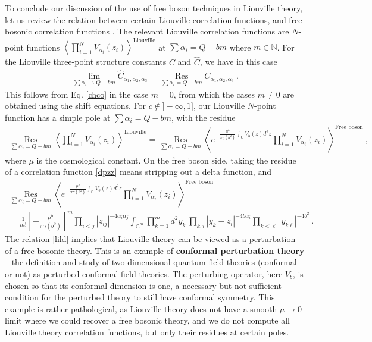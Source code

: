 \documentclass[12pt, a4paper, notitlepage, twoside]{report}
\numberwithin{equation}{section}
\theoremstyle{break}
\begin{document}
To conclude our discussion of the use of free boson techniques in Liouville theory, let us review
the relation between certain Liouville correlation functions, and free bosonic correlation functions \cite{zz95}.
The relevant Liouville correlation functions are $N$-point functions $\left\langle \prod_{i=1}^N V_{\alpha_i}(z_i)\right\rangle^{\text{Liouville}}$ at $\sum\alpha_i = Q-bm$ where $m\in \mathbb{N}$.  
For the Liouville three-point structure constants $C$ and $\hat C$, we have in this case
\begin{align}
 \lim_{\sum\alpha_i \to Q-bm} \hat C_{\alpha_1,\alpha_2,\alpha_3} 
 = \underset{\sum \alpha_i = Q-bm}{\operatorname{Res}}  C_{\alpha_1,\alpha_2,\alpha_3}\ .
\end{align}
This follows from Eq. \eqref{chco} in the case $m=0$, from which the cases $m\neq 0$ are obtained using the shift equations.
For $c\notin ]-\infty,1]$, our Liouville $N$-point function has a simple pole at $\sum\alpha_i = Q-bm$, with the residue
\begin{align}
 \underset{\sum \alpha_i = Q-bm}{\operatorname{Res}} \left\langle \prod_{i=1}^N V_{\alpha_i}(z_i)\right\rangle^{\text{Liouville}} = \underset{\sum\alpha_i = Q-bm}{\operatorname{Res}} \left\langle e^{-\frac{\mu^b}{\pi\gamma(b^2)}\int_{\mathbb{C}} V_b(z)d^2z}\prod_{i=1}^N V_{\alpha_i}(z_i)\right\rangle^{\text{Free boson}}\ ,
\label{lild}
\end{align}
where $\mu$ is the cosmological constant.
On the free boson side, taking the residue of a correlation function \eqref{dpzz} means stripping out a delta function, and 
\begin{multline}
 \underset{\sum\alpha_i = Q-bm}{\operatorname{Res}} \left\langle e^{-\frac{\mu^b}{\pi\gamma(b^2)}\int_{\mathbb{C}} V_b(z)d^2z}\prod_{i=1}^N V_{\alpha_i}(z_i)\right\rangle^{\text{Free boson}}
\\
= \frac{1}{m!}\left[-\frac{\mu^b}{\pi\gamma(b^2)}\right]^m \prod_{i<j} |z_{ij}|^{-4\alpha_i\alpha_j} \int_{{\mathbb{C}}^m} \prod_{k=1}^m d^2y_k\ \prod_{k,i} |y_k-z_i|^{-4b\alpha_i}\prod_{k<\ell} |y_{k\ell}|^{-4b^2}\ .
\label{mint}
\end{multline}
The relation \eqref{lild} implies that Liouville theory can be viewed as a perturbation of a free bosonic theory.
This is an example of \textbf{\boldmath conformal perturbation theory} -- the definition and study of two-dimensional quantum field theories (conformal or not) as perturbed conformal field theories.
The perturbing operator, here $V_b$, is chosen so that its conformal dimension is one, a necessary but not sufficient condition for the perturbed theory to still have conformal symmetry.
This example is rather pathological, as Liouville theory does not have a smooth $\mu\to 0$ limit where we could recover a free bosonic theory, and we do not compute all Liouville theory correlation functions, but only their residues at certain poles. 
\end{document}
